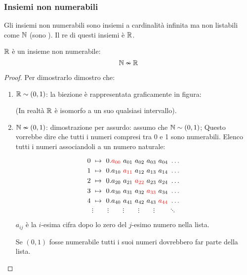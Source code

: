 \subsubsection{Insiemi non numerabili}
Gli insiemi non numerabili sono insiemi a cardinalità infinita ma non listabili come
$\mathbb{N}$ (sono ). Il re di questi insiemi è $\mathbb{R}$.

\begin{theorem}
    $\mathbb{R}$ è un insieme non numerabile: $$ \mathbb{N} \nsim \mathbb{R} $$
\end{theorem}
\begin{proof} Per dimostrarlo dimostro che:
    \begin{enumerate}
        \item $\mathbb{R} \sim (0,1)$: la biezione è rappresentata graficamente in figura:
            \vspace{-.2cm}
            \begin{figure}[H]
                \centering
                
            \end{figure}\vspace{-.6cm}
            (In realtà $\mathbb{R}$ è isomorfo a un suo qualsiasi intervallo).
        \item $\mathbb{N} \nsim (0,1)$: dimostrazione per assurdo: assumo che $\mathbb{N} \sim (0,1)$;
            Questo vorrebbe dire che tutti i numeri compresi tra 0 e 1 sono numerabili.
            Elenco tutti i numeri associandoli a un numero naturale:

            \begin{minipage}{.45\textwidth}
                $$0\ \mapsto \ 0.{\color{red}a_{00}}\ a_{01}\ a_{02}\ a_{03}\ a_{04}\ \dots$$
                $$1\ \mapsto \ 0.a_{10}\ {\color{red}a_{11}}\ a_{12}\ a_{13}\ a_{14}\ \dots$$
                $$2\ \mapsto \ 0.a_{20}\ a_{21}\ {\color{red}a_{22}}\ a_{23}\ a_{24}\ \dots$$
                $$3\ \mapsto \ 0.a_{30}\ a_{31}\ a_{32}\ {\color{red}a_{33}}\ a_{34}\ \dots$$
                $$4\ \mapsto \ 0.a_{40}\ a_{41}\ a_{42}\ a_{43}\ {\color{red}a_{44}}\ \dots$$
                $$\vdots\qquad\vdots\qquad\vdots\qquad\vdots\qquad\vdots\qquad\ddots$$
                \vspace{.4cm}
            \end{minipage}
            \begin{minipage}{.48\textwidth}
                $a_{ij}$ è la $i$-esima cifra dopo lo zero del $j$-esimo numero
                nella lista.

                Se $(0,1)$ fosse numerabile tutti i suoi numeri dovrebbero far parte
                della lista.


\end{minipage}
\end{enumerate}
\end{proof}
